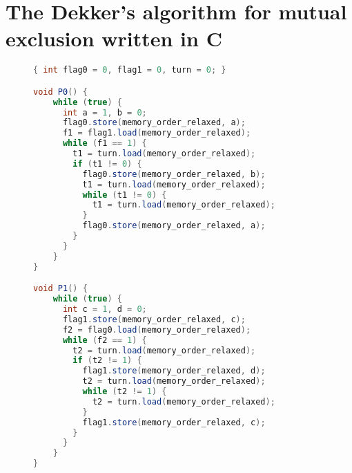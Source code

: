 \newpage
\section{The Dekker's algorithm for mutual exclusion written in C}
\label{apx:dekker}

\begin{figure}
\begin{lstlisting}[language=Java,morekeywords={memory_order_relaxed}]
{ int flag0 = 0, flag1 = 0, turn = 0; }

void P0() {
    while (true) {
      int a = 1, b = 0;
      flag0.store(memory_order_relaxed, a);
      f1 = flag1.load(memory_order_relaxed);
      while (f1 == 1) {
        t1 = turn.load(memory_order_relaxed);
        if (t1 != 0) {
          flag0.store(memory_order_relaxed, b);
          t1 = turn.load(memory_order_relaxed);
          while (t1 != 0) {
            t1 = turn.load(memory_order_relaxed);
          }
          flag0.store(memory_order_relaxed, a);
        }
      }
    }
}

void P1() {
    while (true) {
      int c = 1, d = 0;
      flag1.store(memory_order_relaxed, c);
      f2 = flag0.load(memory_order_relaxed);
      while (f2 == 1) {
        t2 = turn.load(memory_order_relaxed);
        if (t2 != 1) {
          flag1.store(memory_order_relaxed, d);
          t2 = turn.load(memory_order_relaxed);
          while (t2 != 1) {
            t2 = turn.load(memory_order_relaxed);
          }
          flag1.store(memory_order_relaxed, c);
        }
      }
    }
}
\end{lstlisting}



\end{figure}